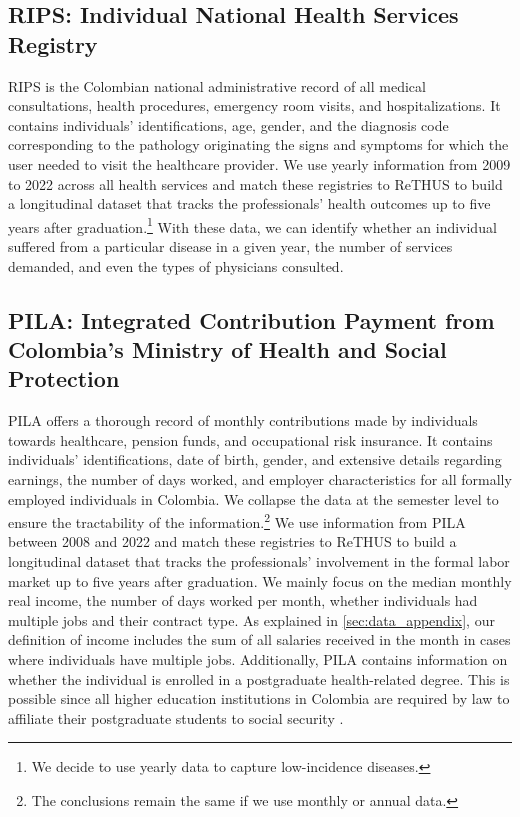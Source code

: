 \documentclass[12pt, a4paper]{article}
\begin{document}
\subsection{RIPS: Individual National Health Services Registry}

RIPS is the Colombian national administrative record of all medical consultations, health procedures, emergency room visits, and hospitalizations. It contains individuals' identifications, age, gender, and the diagnosis code corresponding to the pathology originating the signs and symptoms for which the user needed to visit the healthcare provider. We use yearly information from 2009 to 2022 across all health services and match these registries to ReTHUS to build a longitudinal dataset that tracks the professionals' health outcomes up to five years after graduation.\footnote{We decide to use yearly data to capture low-incidence diseases.} With these data, we can identify whether an individual suffered from a particular disease in a given year, the number of services demanded, and even the types of physicians consulted.


\subsection{PILA: Integrated Contribution Payment from Colombia’s Ministry of Health and Social Protection}


PILA offers a thorough record of monthly contributions made by individuals towards healthcare, pension funds, and occupational risk insurance. It contains individuals' identifications, date of birth, gender, and extensive details regarding earnings, the number of days worked, and employer characteristics for all formally employed individuals in Colombia. We collapse the data at the semester level to ensure the tractability of the information.\footnote{The conclusions remain the same if we use monthly or annual data.} We use information from PILA between 2008 and 2022 and match these registries to ReTHUS to build a longitudinal dataset that tracks the professionals' involvement in the formal labor market up to five years after graduation. We mainly focus on the median monthly real income, the number of days worked per month, whether individuals had multiple jobs and their contract type. As explained in \autoref{sec:data_appendix}, our definition of income includes the sum of all salaries received in the month in cases where individuals have multiple jobs. Additionally, PILA contains information on whether the individual is enrolled in a postgraduate health-related degree. This is possible since all higher education institutions in Colombia are required by law to affiliate their postgraduate students to social security \citep{Minsalud}.
\end{document}
